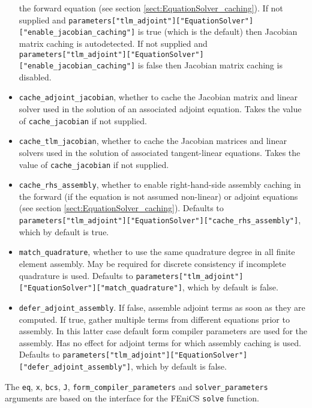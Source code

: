 \documentclass[11pt]{article}
\begin{document}
\begin{itemize}
    the forward equation (see section \ref{sect:EquationSolver_caching}). If
    not supplied and
    \texttt{parameters["tlm\_adjoint"]}\texttt{["EquationSolver"]}\texttt{["enable\_jacobian\_caching"]}
    is true (which is the default) then Jacobian matrix caching is
    autodetected. If not supplied and
    \texttt{parameters["tlm\_adjoint"]}\texttt{["EquationSolver"]}\texttt{["enable\_jacobian\_caching"]}
    is false then Jacobian matrix caching is disabled.
  \item \texttt{cache\_adjoint\_jacobian}, whether to cache the Jacobian matrix
    and linear solver used in the solution of an associated adjoint equation.
    Takes the value of \texttt{cache\_jacobian} if not supplied.
  \item \texttt{cache\_tlm\_jacobian}, whether to cache the Jacobian matrices
    and linear solvers used in the solution of associated tangent-linear
    equations. Takes the value of \texttt{cache\_jacobian} if not supplied.
  \item \texttt{cache\_rhs\_assembly}, whether to enable right-hand-side
    assembly caching in the forward (if the equation is not assumed non-linear)
    or adjoint equations (see section \ref{sect:EquationSolver_caching}).
    Defaults to
    \texttt{parameters["tlm\_adjoint"]}\texttt{["EquationSolver"]}\texttt{["cache\_rhs\_assembly"]},
    which by default is true.
  \item \texttt{match\_quadrature}, whether to use the same quadrature degree
    in all finite element assembly. May be required for discrete consistency if
    incomplete quadrature is used. Defaults to
    \texttt{parameters["tlm\_adjoint"]}\texttt{["EquationSolver"]}\texttt{["match\_quadrature"]},
    which by default is false.
  \item \texttt{defer\_adjoint\_assembly}. If false, assemble adjoint terms as
    soon as they are computed. If true, gather multiple terms from different
    equations prior to assembly. In this latter case default form compiler
    parameters are used for the assembly. Has no effect for adjoint terms for
    which assembly caching is used. Defaults to
    \texttt{parameters["tlm\_adjoint"]}\texttt{["EquationSolver"]}\texttt{["defer\_adjoint\_assembly"]},
    which by default is false.
\end{itemize}
The \texttt{eq}, \texttt{x}, \texttt{bcs}, \texttt{J},
\texttt{form\_compiler\_parameters} and \texttt{solver\_parameters} arguments
are based on the interface for the FEniCS \texttt{solve} function.
\end{document}
